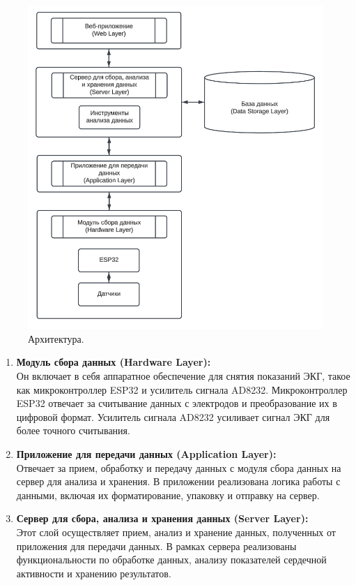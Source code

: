 \documentclass[12pt, russian]{extarticle}
\begin{document}
\begin{spacing}{1.5}
\begin{figure}[htbp]
    \centering
    \includegraphics[scale=0.85]{resources/arch_layers.png}
    \caption{Архитектура.}
    \label{fig:my_label}
\end{figure}


\begin {enumerate}
    \item \textbf{Модуль сбора данных (Hardware Layer):} \\
        Он включает в себя аппаратное обеспечение для снятия показаний ЭКГ, такое как микроконтроллер ESP32 и усилитель сигнала AD8232.
        Микроконтроллер ESP32 отвечает за считывание данных с электродов и преобразование их в цифровой формат.
        Усилитель сигнала AD8232 усиливает сигнал ЭКГ для более точного считывания.

    \item \textbf{Приложение для передачи данных (Application Layer):} \\
        Отвечает за прием, обработку и передачу данных с модуля сбора данных на сервер для анализа и хранения.
        В приложении реализована логика работы с данными, включая их форматирование, упаковку и отправку на сервер.

    \item \textbf{Сервер для сбора, анализа и хранения данных (Server Layer):} \\
        Этот слой осуществляет прием, анализ и хранение данных, полученных от приложения для передачи данных.
        В рамках сервера реализованы функциональности по обработке данных, анализу показателей сердечной активности и хранению результатов.


\end{enumerate}
\end{spacing}
\end{document}
